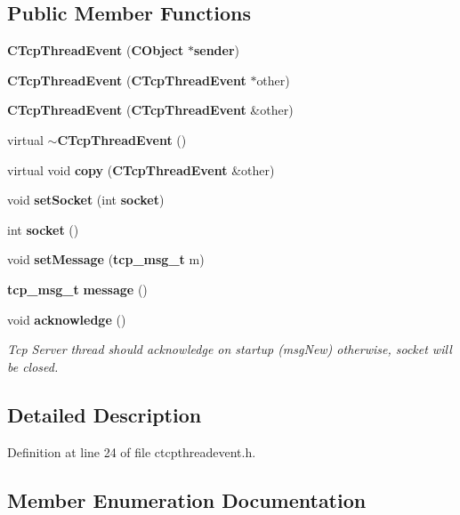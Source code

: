 \subsection*{Public Member Functions}
\begin{DoxyCompactItemize}
\item 
{\bf C\-Tcp\-Thread\-Event} ({\bf C\-Object} $\ast${\bf sender})
\item 
{\bf C\-Tcp\-Thread\-Event} ({\bf C\-Tcp\-Thread\-Event} $\ast$other)
\item 
{\bf C\-Tcp\-Thread\-Event} ({\bf C\-Tcp\-Thread\-Event} \&other)
\item 
virtual {\bf $\sim$\-C\-Tcp\-Thread\-Event} ()
\item 
virtual void {\bf copy} ({\bf C\-Tcp\-Thread\-Event} \&other)
\item 
void {\bf set\-Socket} (int {\bf socket})
\item 
int {\bf socket} ()
\item 
void {\bf set\-Message} ({\bf tcp\-\_\-msg\-\_\-t} m)
\item 
{\bf tcp\-\_\-msg\-\_\-t} {\bf message} ()
\item 
void {\bf acknowledge} ()
\begin{DoxyCompactList}\small\item\em Tcp Server thread should acknowledge on startup (msg\-New) otherwise, socket will be closed. \end{DoxyCompactList}\end{DoxyCompactItemize}


\subsection{Detailed Description}


Definition at line 24 of file ctcpthreadevent.\-h.



\subsection{Member Enumeration Documentation}
